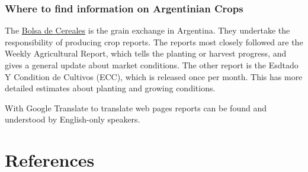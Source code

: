 \documentclass[
  letterpaper,
  DIV=11,
  numbers=noendperiod]{scrreprt}
\begin{document}
\subsection{Where to find information on Argentinian
Crops}\label{where-to-find-information-on-argentinian-crops}

The \href{https://www.bolsadecereales.com/}{Bolsa de Cereales} is the
grain exchange in Argentina. They undertake the responsibility of
producing crop reports. The reports most closely followed are the Weekly
Agricultural Report, which tells the planting or harvest progress, and
gives a general update about market conditions. The other report is the
Esdtado Y Condition de Cultivos (ECC), which is released once per month.
This has more detailed estimates about planting and growing conditions.

With Google Translate to translate web pages reports can be found and
understood by English-only speakers.


\chapter*{References}\label{references-2}

\end{document}
